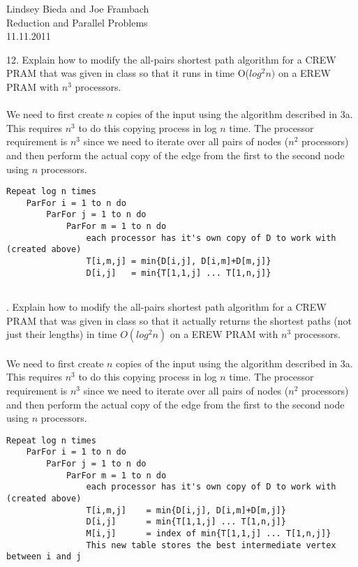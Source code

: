 \documentclass[10pt]{article}
\begin{document}
	\begin{flushright}
	Lindsey Bieda and Joe Frambach\\
	Reduction and Parallel Problems\\
	11.11.2011
	\end{flushright}

12. Explain how to modify the all-pairs shortest path algorithm for a CREW PRAM that was given in
class so that it runs in time O($log^2n)$ on a EREW PRAM with $n^3$ processors.\\
\\
We need to first create $n$ copies of the input using the algorithm described in 3a. This requires
$n^3$ to do this copying process in log $n$ time. The processor requirement is $n^3$ since we need to 
iterate over all pairs of nodes ($n^2$ processors) and then perform the actual copy of the edge from
the first to the second node using $n$ processors.
\begin{verbatim}
Repeat log n times
    ParFor i = 1 to n do
        ParFor j = 1 to n do
            ParFor m = 1 to n do
                each processor has it's own copy of D to work with (created above)
                T[i,m,j] = min{D[i,j], D[i,m]+D[m,j]}
                D[i,j]   = min{T[1,1,j] ... T[1,n,j]}
            
\end{verbatim}  

. Explain how to modify the all-pairs shortest path algorithm for a CREW PRAM that was given in
class so that it actually returns the shortest paths (not just their lengths) in time $O(log^2 n)$ on a EREW
PRAM with $n^3$ processors.\\
\\
We need to first create $n$ copies of the input using the algorithm described in 3a. This requires
$n^3$ to do this copying process in log $n$ time. The processor requirement is $n^3$ since we need to 
iterate over all pairs of nodes ($n^2$ processors) and then perform the actual copy of the edge from
the first to the second node using $n$ processors.
\begin{verbatim}
Repeat log n times
    ParFor i = 1 to n do
        ParFor j = 1 to n do
            ParFor m = 1 to n do
                each processor has it's own copy of D to work with (created above)
                T[i,m,j]    = min{D[i,j], D[i,m]+D[m,j]}
                D[i,j]      = min{T[1,1,j] ... T[1,n,j]}
                M[i,j]      = index of min{T[1,1,j] ... T[1,n,j]}
                This new table stores the best intermediate vertex between i and j
\end{verbatim}  
\end{document}
